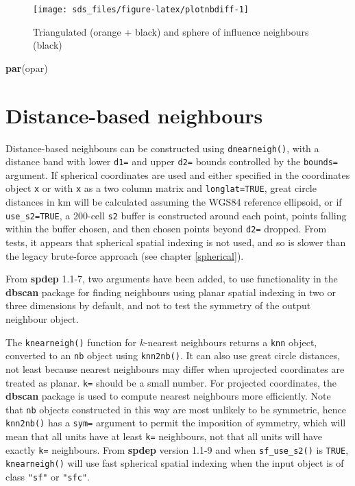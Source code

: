 \documentclass[]{book}
\newenvironment{Shaded}{\begin{snugshade}}{\end{snugshade}}
\newcommand{\KeywordTok}[1]{\textcolor[rgb]{0.13,0.29,0.53}{\textbf{#1}}}
\newcommand{\NormalTok}[1]{#1}
\begin{document}
\begin{figure}

{\centering \texttt{[image: sds\_files/figure-latex/plotnbdiff-1]} 

}

\caption{Triangulated (orange + black) and sphere of influence neighbours (black)}\label{fig:plotnbdiff}
\end{figure}

\begin{Shaded}
\begin{Highlighting}[]
\KeywordTok{par}\NormalTok{(opar)}
\end{Highlighting}
\end{Shaded}

\hypertarget{distance-based-neighbours}{%
\section{Distance-based neighbours}\label{distance-based-neighbours}}

Distance-based neighbours can be constructed using \texttt{dnearneigh()}, with a distance band with lower \texttt{d1=} and upper \texttt{d2=} bounds controlled by the \texttt{bounds=} argument. If spherical coordinates are used and either specified in the coordinates object \texttt{x} or with \texttt{x} as a two column matrix and \texttt{longlat=TRUE}, great circle distances in km will be calculated assuming the WGS84 reference ellipsoid, or if \texttt{use\_s2=TRUE}, a 200-cell \texttt{s2} buffer is constructed around each point, points falling within the buffer chosen, and then chosen points beyond \texttt{d2=} dropped. From tests, it appears that spherical spatial indexing is not used, and so is slower than the legacy brute-force approach (see chapter \ref{spherical}).

From \textbf{spdep} 1.1-7, two arguments have been added, to use functionality in the \textbf{dbscan} package \citep{R-dbscan} for finding neighbours using planar spatial indexing in two or three dimensions by default, and not to test the symmetry of the output neighbour object.

The \texttt{knearneigh()} function for \(k\)-nearest neighbours returns a \texttt{knn} object, converted to an \texttt{nb} object using \texttt{knn2nb()}. It can also use great circle distances, not least because nearest neighbours may differ when uprojected coordinates are treated as planar. \texttt{k=} should be a small number. For projected coordinates, the \textbf{dbscan} package is used to compute nearest neighbours more efficiently. Note that \texttt{nb} objects constructed in this way are most unlikely to be symmetric, hence \texttt{knn2nb()} has a \texttt{sym=} argument to permit the imposition of symmetry, which will mean that all units have at least \texttt{k=} neighbours, not that all units will have exactly \texttt{k=} neighbours. From \textbf{spdep} version 1.1-9 and when \texttt{sf\_use\_s2()} is \texttt{TRUE}, \texttt{knearneigh()} will use fast spherical spatial indexing when the input object is of class \texttt{"sf"} or \texttt{"sfc"}.
\end{document}
